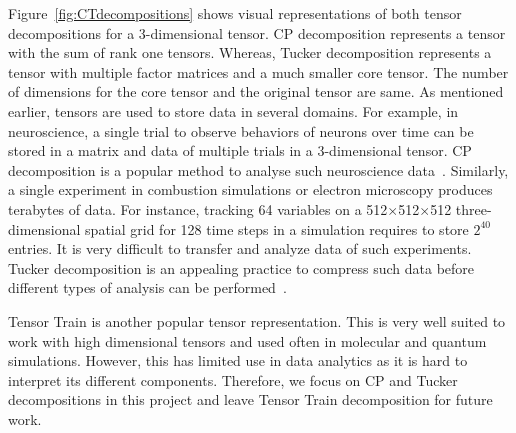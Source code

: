 \documentclass[a4paper,11pt]{article}
\newcommand{\bora}[1]{{\color{magenta} \emph{#1}}}
\begin{document}
	Figure~\ref{fig:CTdecompositions} shows visual representations of both tensor decompositions for a 3-dimensional tensor. CP decomposition represents a tensor with the sum of rank one tensors. Whereas, Tucker decomposition represents a tensor with multiple factor matrices and a much smaller core tensor. The number of dimensions for the core tensor and the original tensor are same. As mentioned earlier, tensors are used to store data in several domains. For example, in neuroscience, a single trial to observe behaviors of neurons over time can be stored in a matrix and data of multiple trials in a 3-dimensional tensor. CP decomposition is a popular method to analyse such neuroscience data~\cite{WKV-Neuron-2018}.
	Similarly, a single experiment in combustion simulations or electron microscopy produces terabytes of data. For instance, tracking 64 variables on a 512$\times$512$\times$512 three-dimensional spatial grid for 128 time steps in a simulation requires to store $2^{40}$ entries. It is very difficult to transfer and analyze data of such experiments. Tucker decomposition is an appealing practice to compress such data before different types of analysis can be performed~\cite{ABK-IPDPS-2016}.
	
	
	
	
    Tensor Train is another popular tensor representation. This is very well suited to work with high dimensional tensors and used often in molecular and quantum simulations. However, this has limited use in data analytics as it is hard to interpret its different components. Therefore, we focus on CP and Tucker decompositions in this project and leave Tensor Train decomposition for future work. 

	
	
\end{document}
